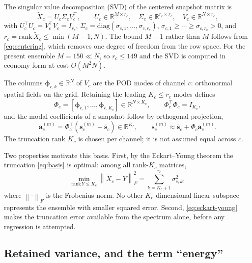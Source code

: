\documentclass[11pt]{article}
\newcommand{\R}{\mathbb{R}}
\newcommand{\bs}[1]{\boldsymbol{#1}}
\newcommand{\norm}[1]{\left\lVert #1 \right\rVert}
\begin{document}
The singular value decomposition (SVD) of the centered snapshot matrix is
\begin{equation}
  \tilde{X}_c = U_c \Sigma_c V_c^{\top},
  \qquad
  U_c \in \R^{M \times r_c}, \quad
  \Sigma_c \in \R^{r_c \times r_c}, \quad
  V_c \in \R^{N \times r_c},
  \label{eq:svd}
\end{equation}
with $U_c^{\top} U_c = V_c^{\top} V_c = I_{r_c}$, $\Sigma_c = \mathrm{diag}(\sigma_{c,1},
\ldots, \sigma_{c,r_c})$, $\sigma_{c,1} \geq \cdots \geq \sigma_{c,r_c} > 0$, and
$r_c = \mathrm{rank}\,\tilde{X}_c \leq \min(M-1, N)$. The bound $M-1$ rather than $M$ follows
from \eqref{eq:centering}, which removes one degree of freedom from the row space. For the
present ensemble $M = 150 \ll N$, so $r_c \leq 149$ and the SVD is computed in economy form
at cost $O(M^2 N)$.

The columns $\bs{\phi}_{c,k} \in \R^{N}$ of $V_c$ are the POD modes of channel $c$:
orthonormal spatial fields on the grid. Retaining the leading $K_c \leq r_c$ modes defines
\begin{equation}
  \Phi_c = \left[ \bs{\phi}_{c,1}, \ldots, \bs{\phi}_{c,K_c} \right] \in \R^{N \times K_c},
  \qquad \Phi_c^{\top} \Phi_c = I_{K_c},
  \label{eq:basis}
\end{equation}
and the modal coefficients of a snapshot follow by orthogonal projection,
\begin{equation}
  \bs{a}_c^{(m)} = \Phi_c^{\top} \left( \bs{s}_c^{(m)} - \bar{\bs{s}}_c \right)
  \in \R^{K_c},
  \qquad
  \bs{s}_c^{(m)} \approx \bar{\bs{s}}_c + \Phi_c \bs{a}_c^{(m)} .
  \label{eq:projection}
\end{equation}
The truncation rank $K_c$ is chosen per channel; it is not assumed equal across $c$.

Two properties motivate this basis. First, by the Eckart--Young theorem the truncation
\eqref{eq:basis} is optimal: among all rank-$K_c$ matrices,
\begin{equation}
  \min_{\mathrm{rank}\,Y \leq K_c} \norm{\tilde{X}_c - Y}_F^2
  = \sum_{k = K_c+1}^{r_c} \sigma_{c,k}^2 ,
  \label{eq:eckart-young}
\end{equation}
where $\norm{\cdot}_F$ is the Frobenius norm. No other $K_c$-dimensional linear subspace
represents the ensemble with smaller squared error. Second, \eqref{eq:eckart-young} makes the
truncation error available from the spectrum alone, before any regression is attempted.

\subsection{Retained variance, and the term ``energy''}
\label{sec:energy}
\end{document}
